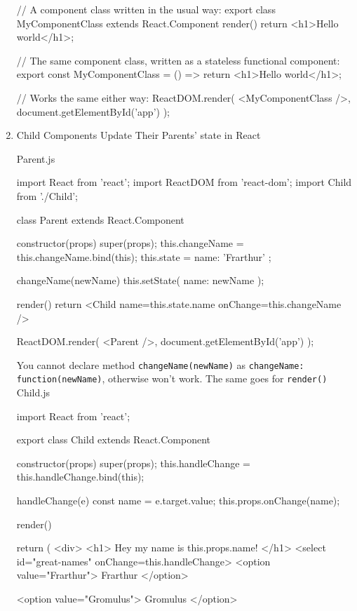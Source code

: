 \documentclass[a4paper,12pt]{article}
\begin{document}
\begin{enumerate}
\begin{jscode}
// A component class written in the usual way:
export class MyComponentClass extends React.Component {
  render() {
    return <h1>Hello world</h1>;
  }
}

// The same component class, written as a stateless functional component:
export const MyComponentClass = () => {
  return <h1>Hello world</h1>;
}

// Works the same either way:
ReactDOM.render(
	<MyComponentClass />,
	document.getElementById('app')
);
\end{jscode}

\item Child Components Update Their Parents' state in React

Parent.js
\begin{jscode}
import React from 'react';
import ReactDOM from 'react-dom';
import { Child } from './Child';

class Parent extends React.Component {
  constructor(props) {
    super(props);
    this.changeName = this.changeName.bind(this);
    this.state = { name: 'Frarthur' };
  }
  
  changeName(newName) {
    this.setState({ name: newName });
  }

  render() {
    return <Child name={this.state.name} onChange={this.changeName} />
  }
}

ReactDOM.render(
	<Parent />,
	document.getElementById('app')
);
\end{jscode}
You cannot declare method \verb|changeName(newName)| as \verb|changeName: function(newName)|, otherwise won't work. The same goes for \verb|render()|\\


Child.js
\begin{jscode}
import React from 'react';

export class Child extends React.Component {
  constructor(props) {
    super(props);
    this.handleChange = this.handleChange.bind(this);
  }
  
  handleChange(e) {
    const name = e.target.value;
    this.props.onChange(name);
  }
  
  render() {
    return (
      <div>
        <h1>
          Hey my name is {this.props.name}!
        </h1>
        <select id="great-names" onChange={this.handleChange}>
          <option value="Frarthur">
            Frarthur
          </option>

          <option value="Gromulus">
            Gromulus
          </option>

}}
\end{jscode}
\end{enumerate}
\end{document}
